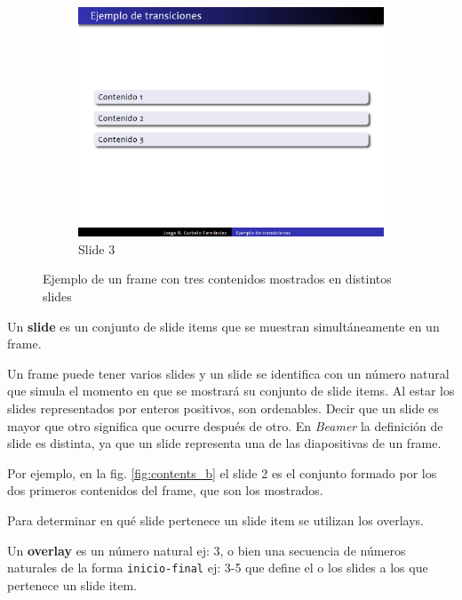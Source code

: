 \begin{figure}[tb]
\begin{subfigure}[b]{0.3\textwidth}
 				\includegraphics[width=\textwidth]{img/content3}
 				\caption{Slide 3}
 				\label{fig:contents_c}	
 			\end{subfigure}	 			
 			\caption{Ejemplo de un frame con tres contenidos mostrados en distintos slides}
 			\label{fig:contents} 
 		\end{figure}

 		\begin{definition}
 		\label{def:slide}
 			Un \textbf{slide} es un conjunto de slide items que se muestran simultáneamente en un frame.
 		\end{definition}
		
		Un frame puede tener varios slides y un slide se identifica con un número natural que simula el momento en que se mostrará su conjunto de slide items. Al estar los slides representados por enteros positivos, son ordenables. Decir que un slide es mayor que otro significa que ocurre después de otro. En \textit{Beamer} la definición de slide es distinta, ya que un slide representa una de las diapositivas de un frame.

		Por ejemplo, en la fig. \ref{fig:contents_b} el slide 2 es el conjunto formado por los dos primeros contenidos del frame, que son los mostrados. 

		Para determinar en qué slide pertenece un slide item se utilizan los overlays.				

 		\begin{definition}
 		\label{def:overlay}
 			Un \textbf{overlay} es un número natural ej: 3, o bien una secuencia de números naturales de la forma \texttt{inicio-final} ej: 3-5 que define el o los slides a los que pertenece un slide item.
 		\end{definition}

